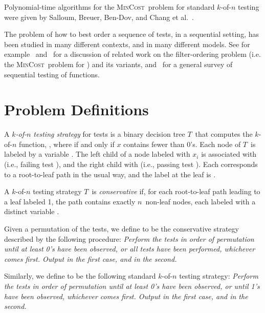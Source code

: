 \documentclass{article}
\newcounter{ass}
\newcommand{\ens}[1]{\ensuremath{#1}}					\newcommand{\card}[1]{\ens{|#1|}}							\newcommand{\dotlist}[2]{\ens{#1,\ldots,#2}}
\newcommand{\anitem}{\ens{x}}
\newcommand{\valn}{\ens{n}}
\newcommand{\valk}{\ens{k}}
\newcommand{\mincost}{\textsc{MinCost}}
\newcommand{\kofn}{\valk-of-\valn}
\newcommand{\strategy}{\ens{T}}
\newcommand{\retval}[1]{\ens{\anitem_{#1}}}					\newcommand{\pr}[1]{\ens{p_{#1}}}									\newcommand{\qr}[1]{\ens{q_{#1}}}									\newcommand{\op}[1]{\ens{O_{#1}}}									\newcommand{\megaop}[1]{\ens{E_{#1}}}
\begin{document}
Polynomial-time algorithms for the
\mincost\ problem for standard \kofn{} testing were given
by Salloum, Breuer, 
Ben-Dov, and Chang et al.~\cite{salloumphd,salloumbreuer,bendov81,journals/tc/ChangSF90,salloumfaster}.

The problem of how to best order a sequence of tests, in
a sequential setting, has been studied in many
different contexts, and in many different models.   
See for example~\cite{conf/pods/LiuPRY08} and~\cite{journals/talg/CondonDHW09}
for a discussion of related work on                                                                                        
the filter-ordering problem (i.e. the \mincost\ problem for )
and its variants, and~\cite{unluyurt2004189} for a general survey 
of sequential testing of functions.







\section{Problem Definitions}


A {\em \kofn{} testing strategy} for tests  is a binary decision tree 
\strategy\ that computes the \kofn{} function, 
, where  if and only if
\anitem{} contains fewer than  0's.
Each node of \strategy\ is labeled by a variable .
The left child of a node labeled with \retval{i} is associated
with  (i.e., failing test ), and the right child 
with  (i.e., passing test ). 
Each  corresponds to a root-to-leaf path
in the usual way, and the label at the leaf is  
.

A \kofn{} testing strategy \strategy\ is {\em conservative} if, 
for each root-to-leaf path leading
to a leaf labeled 1, the path contains exactly \valn\ non-leaf nodes,
each labeled with a distinct variable .

Given a permutation  of the  tests, we define 
\cstrat{\valk}{\perm} to be the conservative strategy described by the following procedure:
{\it Perform the tests
in order of permutation  until at least  0's have been observed,
or all tests have been performed, whichever
comes first.  Output  in the first case, and  in the second.}


Similarly, we define \sstrat{\valk}{\perm} to be the following
standard \kofn{} testing strategy:
{\it Perform the tests
in order of permutation  until at least  0's have been observed,
or until  1's have been observed, whichever
comes first.  Output  in the first case, and  in the second.}
\end{document}
